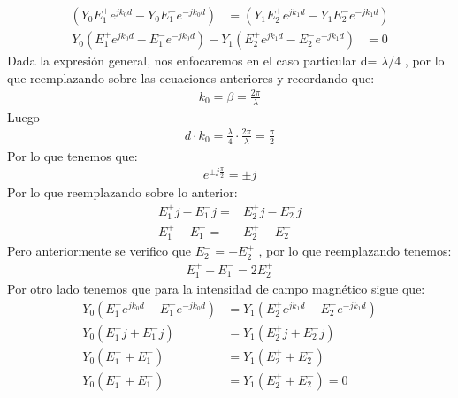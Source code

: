 \documentclass[
  11pt,
  letterpaper,
   addpoints,
   answers
  ]{exam}
\begin{document}
\begin{questions}
\begin{solution}
\begin{enumerate}
            \begin{align}
                  ( Y_{0}E_{1}^{+}e^{jk_{0}d} - Y_{0} E_{1}^{-}e^{-jk_{0}d}) &= ( Y_{1}E_{2}^{+}e^{jk_{1}d} - Y_{1} E_{2}^{-}e^{-jk_{1}d})
            \end{align}
            \begin{align}
                   Y_{0}(E_{1}^{+}e^{jk_{0}d}-E_{1}^{-}e^{-jk_{0}d}) - Y_{1}(E_{2}^{+}e^{jk_{1}d} - E_{2}^{-}e^{-jk_{1}d})&=0
            \end{align}
            Dada la expresión general, nos enfocaremos en el caso particular  d= $\lambda/4$ , por lo que reemplazando sobre las ecuaciones anteriores y recordando que:
            \begin{align}
                k_{0}=\beta = \frac{2\pi}{\lambda}
            \end{align}
            Luego
            \begin{align}
                d\cdot k_{0} = \frac{\lambda}{4} \cdot  \frac{2\pi}{\lambda}
                 = \frac{\pi}{2}
            \end{align}
            Por lo que tenemos que:
            \begin{align}
                e^{\pm j\frac{\pi}{2}} =  \pm j
            \end{align}
            Por lo que reemplazando sobre lo anterior:
            \begin{align}
                E_{1}^{+}j - E_{1}^{-}j =& E_{2}^{+}j - E_{2}^{-}j\\
                 E_{1}^{+} - E_{1}^{-} =& E_{2}^{+} - E_{2}^{-}
            \end{align}
            Pero anteriormente se verifico que $E_{2}^{-} = -E_{2}^{+} $ , por lo que reemplazando tenemos:
            \begin{align}
                E_{1}^{+} - E_{1}^{-} = 2E_{2}^{+}
            \end{align}
            Por otro lado tenemos que para la intensidad de campo magnético sigue que:
            \begin{align}
                 Y_{0}(E_{1}^{+}e^{jk_{0}d}-E_{1}^{-}e^{-jk_{0}d}) &= Y_{1}(E_{2}^{+}e^{jk_{1}d} - E_{2}^{-}e^{-jk_{1}d})\\
                Y_{0}(E_{1}^{+}j+E_{1}^{-}j) &= Y_{1}(E_{2}^{+}j +E_{2}^{-}j)\\
                Y_{0}(E_{1}^{+}+E_{1}^{-}) &= Y_{1}(E_{2}^{+} +E_{2}^{-})\\
                Y_{0}(E_{1}^{+}+E_{1}^{-})&= Y_{1}(E_{2}^{+} +E_{2}^{-})=0\\

\end{align}
\end{enumerate}
\end{solution}
\end{questions}
\end{document}
